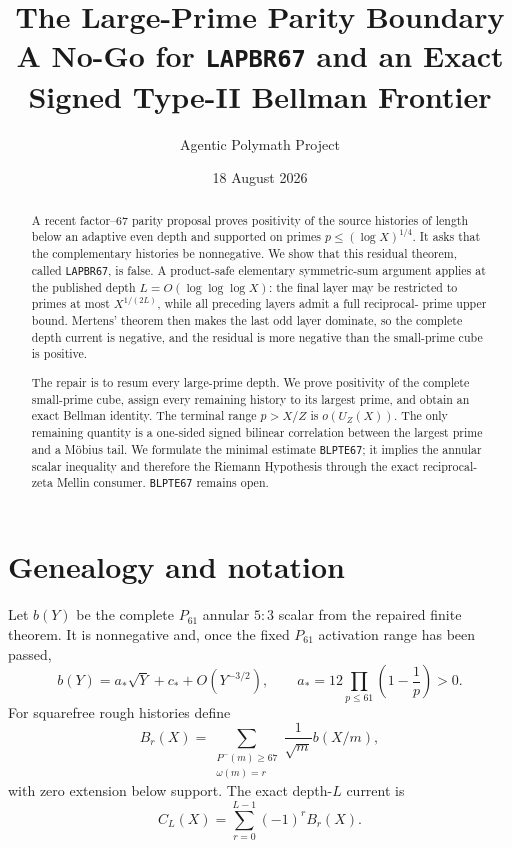 \documentclass[11pt]{article}
\title{\bfseries The Large-Prime Parity Boundary\\[2mm]
\large A No-Go for \texttt{LAPBR67} and an Exact Signed Type-II Bellman Frontier}
\author{Agentic Polymath Project}
\date{18 August 2026}
\newcommand{\1}{\mathbf 1}
\begin{document}
\maketitle
\begin{center}
\end{center}
\begin{abstract}
A recent factor--67 parity proposal proves positivity of the source histories
of length below an adaptive even depth and supported on primes
$p\le (\log X)^{1/4}$.  It asks that the complementary histories be
nonnegative.  We show that this residual theorem, called \texttt{LAPBR67}, is
false.  A product-safe elementary symmetric-sum argument applies at the
published depth $L=O(\log\log\log X)$: the final layer may be restricted to
primes at most $X^{1/(2L)}$, while all preceding layers admit a full reciprocal-
prime upper bound.  Mertens' theorem then makes the last odd layer dominate, so
the complete depth current is
negative, and the residual is more negative than the small-prime cube is
positive.

The repair is to resum every large-prime depth.  We prove positivity of the
complete small-prime cube, assign every remaining history to its largest prime,
and obtain an exact Bellman identity.  The terminal range $p>X/Z$ is
$o(U_Z(X))$.  The only remaining quantity is a one-sided signed bilinear
correlation between the largest prime and a M\"obius tail.  We formulate the
minimal estimate \texttt{BLPTE67}; it implies the annular scalar inequality and
therefore the Riemann Hypothesis through the exact reciprocal-zeta Mellin
consumer.  \texttt{BLPTE67} remains open.
\end{abstract}
\tableofcontents

\section{Genealogy and notation}
Let $b(Y)$ be the complete $P_{61}$ annular $5{:}3$ scalar from the repaired
finite theorem.  It is nonnegative and, once the fixed $P_{61}$ activation
range has been passed,
\begin{equation}\label{eq:base-asymp}
 b(Y)=a_*\sqrt Y+c_*+O(Y^{-3/2}),
 \qquad
 a_*=12\prod_{p\le61}\left(1-\frac1p\right)>0.
\end{equation}
For squarefree rough histories define
\begin{equation}\label{eq:Br}
 B_r(X)=\sum_{\substack{P^-(m)\ge67\\\omega(m)=r}}
 \frac1{\sqrt m}b(X/m),
\end{equation}
with zero extension below support.  The exact depth-$L$ current is
\begin{equation}\label{eq:CL}
 C_L(X)=\sum_{r=0}^{L-1}(-1)^rB_r(X).
\end{equation}
\end{document}
